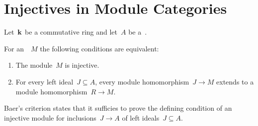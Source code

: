 \section{Injectives in Module Categories}


\begin{conventionnonum}
  Let~$\mathbf{k}$ be a commutative ring and let~$A$ be a~{\kalg}.
\end{conventionnonum}


\begin{theorem}
  \label{baers criterion}
  For an~{}~$M$ the following conditions are equivalent:
  \begin{enumerate}
    \item
      The module~$M$ is injective.
    \item
      \label{Baer condition}
      For every left ideal~$J \subseteq A$, every module homomorphism~$J \to M$ extends to a module homomorphism~$R \to M$.
  \end{enumerate}
\end{theorem}


\begin{remark*}
  Baer’s criterion states that it sufficies to prove the defining condition of an injective module for inclusions~$J \to A$ of left ideals~$J \subseteq A$.
\end{remark*}



